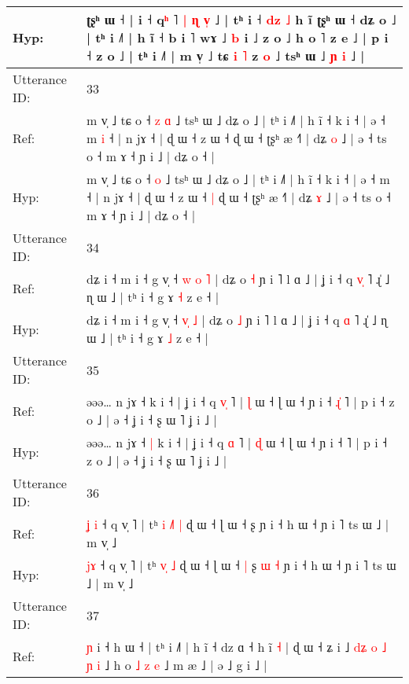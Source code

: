 \documentclass[10pt]{article}
\DeclareRobustCommand{\hl}[1]{{\textcolor{red}{#1}}}
\begin{document}
\begin{longtable}{ll}
 \\
Hyp: & ʈʂʰ ɯ ˧ |\hl{}\hl{} i ˧ q\hl{}\hl{}\hl{ʰ} ˥ \hl{}\hl{|} \hl{ɳ} \hl{}\hl{v}\hl{̩} ˩ | tʰ i ˧ \hl{}\hl{d}\hl{z} \hl{˩} h ĩ\hl{}\hl{} ʈʂʰ ɯ ˧ dʑ o ˩ | tʰ i ˩˥ | h ĩ ˧ b i ˥\hl{}\hl{} wɤ ˩ \hl{b} i\hl{} ˩ z o ˩ h o ˥ z e ˩ | p i ˧ z o ˩ | tʰ i ˩˥ | m v̩ ˩ tɕ \hl{i} \hl{˥} z \hl{o} ˩ tsʰ ɯ ˩ \hl{ɲ} \hl{i} ˩ |
 \\
\midrule
Utterance ID: & 33 \\
Ref: & m v̩ ˩ tɕ o ˧\hl{ }\hl{z} \hl{ɑ} ˩ tsʰ ɯ ˩ dʑ o ˩ | tʰ i ˩˥ | h ĩ ˧ k i ˧ | ə ˧ m\hl{ }\hl{i} ˧ | n jɤ ˧ | ɖ ɯ ˧ z ɯ ˧\hl{}\hl{} ɖ ɯ ˧ ʈʂʰ æ ˧˥ | dʑ \hl{o} ˩ | ə ˧ ts o ˧ m ɤ ˧ ɲ i ˩ | dʑ o ˧ |
 \\
Hyp: & m v̩ ˩ tɕ o ˧\hl{}\hl{} \hl{o} ˩ tsʰ ɯ ˩ dʑ o ˩ | tʰ i ˩˥ | h ĩ ˧ k i ˧ | ə ˧ m\hl{}\hl{} ˧ | n jɤ ˧ | ɖ ɯ ˧ z ɯ ˧\hl{ }\hl{|} ɖ ɯ ˧ ʈʂʰ æ ˧˥ | dʑ \hl{ɤ} ˩ | ə ˧ ts o ˧ m ɤ ˧ ɲ i ˩ | dʑ o ˧ |
 \\
\midrule
Utterance ID: & 34 \\
Ref: & dʑ i ˧ m i ˧ g v̩ ˧ \hl{w}\hl{ }\hl{o} \hl{˥} | dʑ o \hl{˧} ɲ i ˥ l ɑ ˩ | ʝ i ˧ q \hl{v}\hl{̩} ˥ ɻ̍ ˩ ɳ ɯ ˩ | tʰ i ˧ g ɤ \hl{˧} z e ˧ |
 \\
Hyp: & dʑ i ˧ m i ˧ g v̩ ˧ \hl{}\hl{v}\hl{̩} \hl{˩} | dʑ o \hl{˩} ɲ i ˥ l ɑ ˩ | ʝ i ˧ q \hl{}\hl{ɑ} ˥ ɻ̍ ˩ ɳ ɯ ˩ | tʰ i ˧ g ɤ \hl{˩} z e ˧ |
 \\
\midrule
Utterance ID: & 35 \\
Ref: & əəə… n jɤ ˧\hl{}\hl{} k i ˧ | ʝ i ˧ q \hl{v}\hl{̩} ˥ | \hl{ɭ} ɯ ˧ ɭ ɯ ˧ ɲ i ˧\hl{ }\hl{ɻ}\hl{̍} ˥ | p i ˧ z o ˩ | ə ˧ ʝ i ˧ ʂ ɯ ˥ ʝ i ˩ |
 \\
Hyp: & əəə… n jɤ ˧\hl{ }\hl{|} k i ˧ | ʝ i ˧ q \hl{}\hl{ɑ} ˥ | \hl{ɖ} ɯ ˧ ɭ ɯ ˧ ɲ i ˧\hl{}\hl{}\hl{} ˥ | p i ˧ z o ˩ | ə ˧ ʝ i ˧ ʂ ɯ ˥ ʝ i ˩ |
 \\
\midrule
Utterance ID: & 36 \\
Ref: & \hl{ʝ}\hl{ }\hl{i} ˧ q v̩ ˥ | tʰ\hl{ }\hl{i} \hl{˩}\hl{˥} \hl{|} ɖ ɯ ˧ ɭ ɯ ˧\hl{}\hl{} ʂ\hl{}\hl{}\hl{}\hl{} ɲ i ˧ h ɯ ˧ ɲ i ˥ ts ɯ ˩ | m v̩ ˩
 \\
Hyp: & \hl{}\hl{j}\hl{ɤ} ˧ q v̩ ˥ | tʰ\hl{}\hl{} \hl{v}\hl{̩} \hl{˩} ɖ ɯ ˧ ɭ ɯ ˧\hl{ }\hl{|} ʂ\hl{ }\hl{ɯ}\hl{ }\hl{˧} ɲ i ˧ h ɯ ˧ ɲ i ˥ ts ɯ ˩ | m v̩ ˩
 \\
\midrule
Utterance ID: & 37 \\
Ref: & \hl{ɲ} i ˧ h ɯ ˧ | tʰ i ˩˥ | h ĩ ˧\hl{}\hl{} dz ɑ ˧ h ĩ \hl{˧} | ɖ ɯ ˧ ʑ i ˩ \hl{d}\hl{ʑ} \hl{o} \hl{˩} \hl{ɲ}\hl{ }\hl{i} ˩ h o\hl{ }\hl{˩}\hl{ }\hl{z}\hl{ }\hl{e} ˩ m æ ˩ | ə ˩ g i ˩ |
 \\

\end{longtable}
\end{document}
